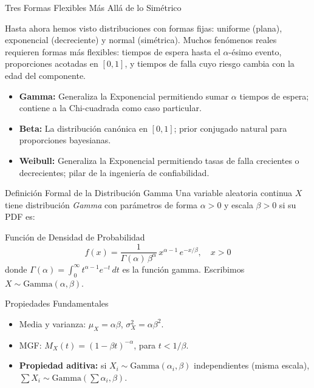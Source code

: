 \documentclass[10pt, aspectratio=169]{beamer}
\begin{document}
\begin{frame}{Tres Formas Flexibles Más Allá de lo Simétrico}
  \footnotesize
  \begin{motivacion}
    Hasta ahora hemos visto distribuciones con formas fijas: uniforme (plana), exponencial (decreciente) y normal (simétrica). Muchos fenómenos reales requieren formas más flexibles: tiempos de espera hasta el $\alpha$-ésimo evento, proporciones acotadas en $[0,1]$, y tiempos de falla cuyo riesgo cambia con la edad del componente.
  \end{motivacion}

  \vspace{0.15cm}
  \pause
  \begin{itemize}\itemsep=0.1cm
    \item \textbf{Gamma:} Generaliza la Exponencial permitiendo sumar $\alpha$ tiempos de espera; contiene a la Chi-cuadrada como caso particular. \pause
    \item \textbf{Beta:} La distribución canónica en $[0,1]$; prior conjugado natural para proporciones bayesianas. \pause
    \item \textbf{Weibull:} Generaliza la Exponencial permitiendo tasas de falla crecientes o decrecientes; pilar de la ingeniería de confiabilidad.
  \end{itemize}
\end{frame}

\begin{frame}{Definición Formal de la Distribución Gamma}
  \footnotesize
  Una variable aleatoria continua $X$ tiene distribución \emph{Gamma} con parámetros de forma $\alpha > 0$ y escala $\beta > 0$ si su PDF es: \pause

  \vspace{0.1cm}
  \begin{block}{Función de Densidad de Probabilidad}
    $$f(x) = \dfrac{1}{\Gamma(\alpha)\,\beta^{\alpha}}\,x^{\alpha-1}\,e^{-x/\beta}, \quad x > 0$$
    donde $\Gamma(\alpha) = \int_{0}^{\infty} t^{\alpha-1}e^{-t}\,dt$ es la función gamma. Escribimos $X \sim \text{Gamma}(\alpha, \beta)$.
  \end{block}

  \vspace{0.1cm}
  \pause
  \begin{alertblock}{Propiedades Fundamentales}
    \begin{itemize}\itemsep=0.05cm
      \item Media y varianza: $\mu_{X} = \alpha\beta$, $\sigma_{X}^{2} = \alpha\beta^{2}$.
      \item MGF: $M_{X}(t) = (1-\beta t)^{-\alpha}$, para $t < 1/\beta$.
      \item \textbf{Propiedad aditiva:} si $X_{i} \sim \text{Gamma}(\alpha_{i}, \beta)$ independientes (misma escala), $\sum X_{i} \sim \text{Gamma}(\sum \alpha_{i}, \beta)$.
    \end{itemize}
  \end{alertblock}
\end{frame}
\end{document}
